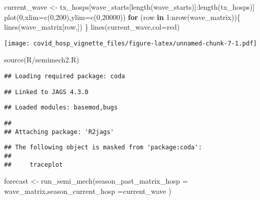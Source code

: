\documentclass[
]{article}
\newenvironment{Shaded}{\begin{snugshade}}{\end{snugshade}}
\newcommand{\AttributeTok}[1]{\textcolor[rgb]{0.77,0.63,0.00}{#1}}
\newcommand{\ControlFlowTok}[1]{\textcolor[rgb]{0.13,0.29,0.53}{\textbf{#1}}}
\newcommand{\DecValTok}[1]{\textcolor[rgb]{0.00,0.00,0.81}{#1}}
\newcommand{\FunctionTok}[1]{\textcolor[rgb]{0.00,0.00,0.00}{#1}}
\newcommand{\NormalTok}[1]{#1}
\newcommand{\OtherTok}[1]{\textcolor[rgb]{0.56,0.35,0.01}{#1}}
\newcommand{\SpecialCharTok}[1]{\textcolor[rgb]{0.00,0.00,0.00}{#1}}
\newcommand{\StringTok}[1]{\textcolor[rgb]{0.31,0.60,0.02}{#1}}
\begin{document}
\begin{Shaded}
\begin{Highlighting}[]
\NormalTok{current\_wave }\OtherTok{\textless{}{-}}\NormalTok{ tx\_hosps[wave\_starts[}\FunctionTok{length}\NormalTok{(wave\_starts)]}\SpecialCharTok{:}\FunctionTok{length}\NormalTok{(tx\_hosps)]}
\FunctionTok{plot}\NormalTok{(}\DecValTok{0}\NormalTok{,}\AttributeTok{xlim=}\FunctionTok{c}\NormalTok{(}\DecValTok{0}\NormalTok{,}\DecValTok{200}\NormalTok{),}\AttributeTok{ylim=}\FunctionTok{c}\NormalTok{(}\DecValTok{0}\NormalTok{,}\DecValTok{20000}\NormalTok{))}
\ControlFlowTok{for}\NormalTok{ (row }\ControlFlowTok{in} \DecValTok{1}\SpecialCharTok{:}\FunctionTok{nrow}\NormalTok{(wave\_matrix))\{}
  \FunctionTok{lines}\NormalTok{(wave\_matrix[row,])}
\NormalTok{\}}
\FunctionTok{lines}\NormalTok{(current\_wave,}\AttributeTok{col=}\StringTok{\textquotesingle{}red\textquotesingle{}}\NormalTok{)}
\end{Highlighting}
\end{Shaded}

\texttt{[image: covid\_hosp\_vignette\_files/figure-latex/unnamed-chunk-7-1.pdf]}

\begin{Shaded}
\begin{Highlighting}[]
\FunctionTok{source}\NormalTok{(}\StringTok{\textquotesingle{}R/semimech2.R\textquotesingle{}}\NormalTok{)}
\end{Highlighting}
\end{Shaded}

\begin{verbatim}
## Loading required package: coda
\end{verbatim}

\begin{verbatim}
## Linked to JAGS 4.3.0
\end{verbatim}

\begin{verbatim}
## Loaded modules: basemod,bugs
\end{verbatim}

\begin{verbatim}
## 
## Attaching package: 'R2jags'
\end{verbatim}

\begin{verbatim}
## The following object is masked from 'package:coda':
## 
##     traceplot
\end{verbatim}

\begin{Shaded}
\begin{Highlighting}[]
\NormalTok{forecast }\OtherTok{\textless{}{-}} \FunctionTok{run\_semi\_mech}\NormalTok{(}\AttributeTok{season\_past\_matrix\_hosp =}\NormalTok{ wave\_matrix,}\AttributeTok{season\_current\_hosp =}\NormalTok{current\_wave )}
\end{Highlighting}
\end{Shaded}
\end{document}
